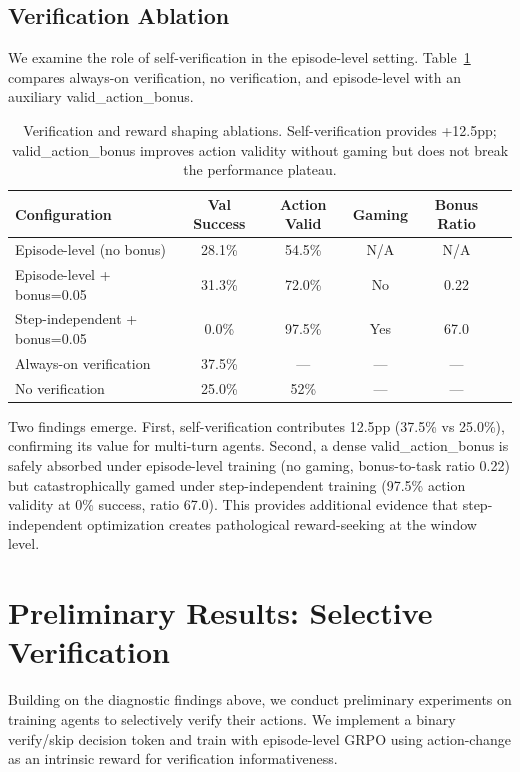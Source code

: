 \documentclass[11pt]{article}
\begin{document}
\subsection{Verification Ablation}

We examine the role of self-verification in the episode-level setting. Table~\ref{tab:verify_ablation} compares always-on verification, no verification, and episode-level with an auxiliary valid\_action\_bonus.

\begin{table}[h]
\centering
\caption{Verification and reward shaping ablations. Self-verification provides +12.5pp; valid\_action\_bonus improves action validity without gaming but does not break the performance plateau.}
\label{tab:verify_ablation}
\begin{tabular}{lccccc}
\toprule
Configuration & Val Success & Action Valid & Gaming & Bonus Ratio \\
\midrule
Episode-level (no bonus) & 28.1\% & 54.5\% & N/A & N/A \\
Episode-level + bonus=0.05 & 31.3\% & 72.0\% & No & 0.22 \\
Step-independent + bonus=0.05 & 0.0\% & 97.5\% & Yes & 67.0 \\
\midrule
Always-on verification & 37.5\% & --- & --- & --- \\
No verification & 25.0\% & 52\% & --- & --- \\
\bottomrule
\end{tabular}
\end{table}

Two findings emerge. First, self-verification contributes 12.5pp (37.5\% vs 25.0\%), confirming its value for multi-turn agents. Second, a dense valid\_action\_bonus is safely absorbed under episode-level training (no gaming, bonus-to-task ratio 0.22) but catastrophically gamed under step-independent training (97.5\% action validity at 0\% success, ratio 67.0). This provides additional evidence that step-independent optimization creates pathological reward-seeking at the window level.

\section{Preliminary Results: Selective Verification}
\label{sec:selective}

Building on the diagnostic findings above, we conduct preliminary experiments on training agents to selectively verify their actions. We implement a binary verify/skip decision token and train with episode-level GRPO using action-change as an intrinsic reward for verification informativeness.
\end{document}
